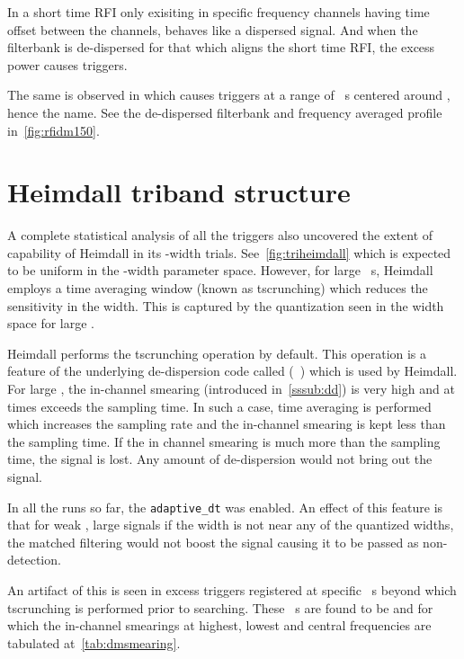 \par In a short time RFI only exisiting in specific frequency channels having time offset between the channels, behaves like a dispersed signal. And when the filterbank is de-dispersed for that \dm which aligns the short time RFI, the excess power causes triggers. 

\par The same is observed in \vfpfs which causes triggers at a range of \dm~s centered around , hence the name. See the de-dispersed filterbank and frequency averaged profile in~\autoref{fig:rfidm150}.

\begin{figure}
	\label{fig:rfidm150}
	\caption{}
\end{figure}

\section {Heimdall triband structure}
\par A complete statistical analysis of all the triggers also uncovered the extent of capability of Heimdall in its \dm-width trials.
See~\autoref{fig:triheimdall} which is expected to be uniform in the \dm-width parameter space. 
However, for large \dm~s, Heimdall employs a time averaging window (known as tscrunching) which reduces the sensitivity in the width. 
This is captured by the quantization seen in the width space for large \dm.

\par Heimdall performs the tscrunching operation by default. 
This operation is a feature of the underlying de-dispersion code called (~\cite{dedisp}) which is used by Heimdall. 
For large \dm, the in-channel smearing (introduced in~\autoref{sssub:dd}) is very high and at times exceeds the sampling time. In such a case, time averaging is performed which increases the sampling rate and the in-channel smearing is kept less than the sampling time.
If the in channel smearing is much more than the sampling time, the signal is lost. Any amount of de-dispersion would not bring out the signal.

\par In all the runs so far, the \texttt{adaptive\_dt} was enabled. 
An effect of this feature is that for weak \sn, large \dm signals if the width is not near any of the quantized widths, the matched filtering would not boost the signal causing it to be passed as non-detection.

\par An artifact of this is seen in excess triggers registered at specific \dm~s beyond which tscrunching is performed prior to searching.
These \dm~s are found to be  and  for which the in-channel smearings at highest, lowest and central frequencies are tabulated at~\autoref{tab:dmsmearing}.

